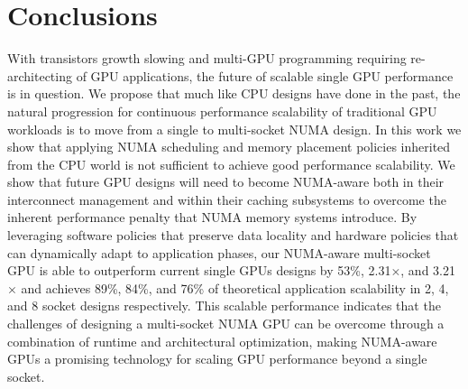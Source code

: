 \section{Conclusions}
\label{conclusions}
With transistors growth slowing and multi-GPU programming requiring 
re-architecting of GPU applications, the future of scalable single GPU 
performance is in question.  We propose that much like CPU designs have done in 
the past, the natural progression for continuous performance scalability of 
traditional GPU workloads is to move from a single to multi-socket NUMA design.  
In this work we show 
that applying NUMA scheduling and memory placement policies inherited 
from the CPU world is not sufficient to achieve good performance scalability.  
We show that future GPU designs will need to become NUMA-aware both in their 
interconnect management and within their caching subsystems to overcome the 
inherent performance penalty that NUMA memory systems introduce.  By leveraging 
software policies that preserve data locality and hardware policies that can 
dynamically adapt to application phases, our NUMA-aware multi-socket GPU is able to 
outperform current single GPUs designs by 53\%, 2.31$\times$, and 3.21$\times$ and 
achieves 89\%, 84\%, and 76\% of theoretical application scalability in 2, 4, 
and 8 socket designs respectively.  This scalable performance indicates that the 
challenges of designing a multi-socket NUMA GPU can be overcome through a combination
of runtime and architectural optimization, making 
NUMA-aware GPUs a promising technology for scaling GPU performance beyond a 
single socket.


